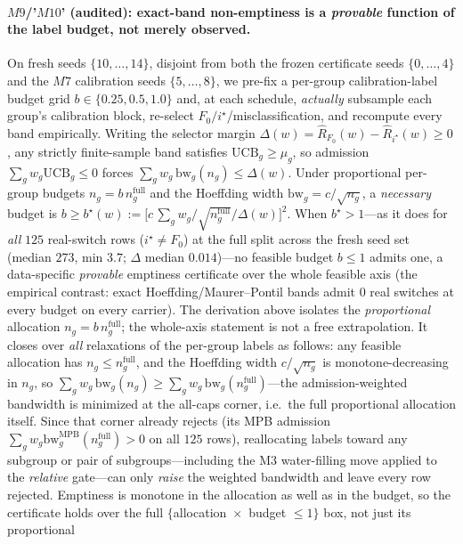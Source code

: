 \documentclass{article}
\begin{document}
\paragraph{$M9$/'$M10$' (audited): exact-band non-emptiness is a \emph{provable} function of the
label budget, not merely observed.}
On fresh seeds $\{10,\dots,14\}$, disjoint from both the frozen certificate seeds
$\{0,\dots,4\}$ and the $M7$ calibration seeds $\{5,\dots,8\}$, we pre-fix a per-group
calibration-label budget grid $b\!\in\!\{0.25,0.5,1.0\}$ and, at each schedule, \emph{actually}
subsample each group's calibration block, re-select $F_0/i^\star$/misclassification, and recompute
every band empirically. Writing the selector margin $\Delta(w)\!=\!\hat R_{F_0}(w)\!-\!\hat
R_{i^\star}(w)\ge0$, any strictly finite-sample band satisfies $\mathrm{UCB}_g\ge\mu_g$, so
admission $\sum_g w_g\mathrm{UCB}_g\le0$ forces $\sum_g w_g\,\mathrm{bw}_g(n_g)\le\Delta(w)$.
Under proportional per-group budgets $n_g=b\,n_g^{\mathrm{full}}$ and the Hoeffding width
$\mathrm{bw}_g=c/\sqrt{n_g}$, a \emph{necessary} budget is
$b\ge b^\star(w)\!:=\!\big[c\,\sum_g w_g/\sqrt{n_g^{\mathrm{full}}}/\Delta(w)\big]^2$. When
$b^\star>1$---as it does for \emph{all} $125$ real-switch rows ($i^\star\!\ne\!F_0$) at the full
split across the fresh seed set (median $273$, min $3.7$; $\Delta$ median $0.014$)---no feasible
budget $b\le1$ admits one, a data-specific \emph{provable} emptiness certificate over the whole
feasible axis (the empirical contrast: exact Hoeffding/Maurer--Pontil bands admit $0$ real
switches at every budget on every carrier). The derivation above isolates the \emph{proportional}
allocation $n_g=b\,n_g^{\mathrm{full}}$; the whole-axis statement is not a free extrapolation.
It closes over \emph{all} relaxations of the per-group labels as follows: any feasible allocation
has $n_g\le n_g^{\mathrm{full}}$, and the Hoeffding width $c/\sqrt{n_g}$ is monotone-decreasing in
$n_g$, so $\sum_g w_g\,\mathrm{bw}_g(n_g)\ge\sum_g w_g\,\mathrm{bw}_g(n_g^{\mathrm{full}})$---the
admission-weighted bandwidth is minimized at the all-caps corner, i.e.\ the full proportional
allocation itself. Since that corner already rejects (its MPB admission
$\sum_g w_g\mathrm{bw}^{\mathrm{MPB}}_g(n_g^{\mathrm{full}})>0$ on all $125$ rows), reallocating
labels toward any subgroup or pair of subgroups---including the M3 water-filling move applied to
the \emph{relative} gate---can only \emph{raise} the weighted bandwidth and leave every row
rejected. Emptiness is monotone in the allocation as well as in the budget, so the certificate
holds over the full $\{$allocation ${}\times{}$ budget $\le1\}$ box, not just its proportional
\end{document}
